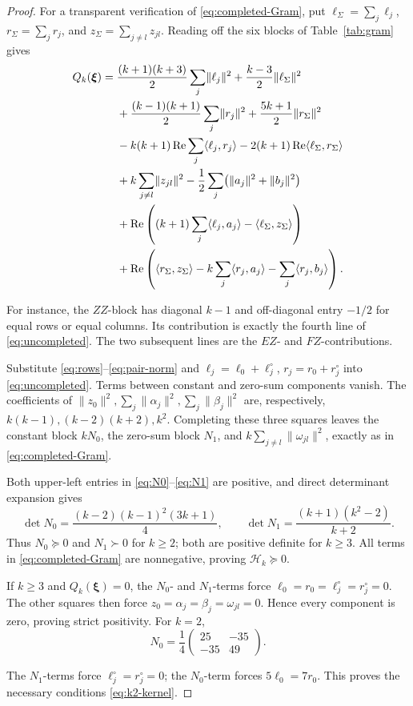 \documentclass[11pt]{article}
\newcommand{\Rea}{\operatorname{Re}}
\newcommand{\gH}{\mathscr H}
\newcommand{\ip}[2]{\langle #1,#2\rangle}
\newcommand{\nrm}[1]{\lVert #1\rVert}
\begin{document}
\begin{proof}
For a transparent verification of \eqref{eq:completed-Gram}, put
\(\ell_\Sigma=\sum_j\ell_j\), \(r_\Sigma=\sum_jr_j\), and
\(z_\Sigma=\sum_{j\ne l}z_{jl}\).
Reading off the six blocks of Table~\ref{tab:gram} gives
\begin{align}
 Q_k(\boldsymbol{\xi})={}&
 \frac{(k+1)(k+3)}2\sum_j\nrm{\ell_j}^2
   +\frac{k-3}2\nrm{\ell_\Sigma}^2
 \notag\\
 &+\frac{(k-1)(k+1)}2\sum_j\nrm{r_j}^2
   +\frac{5k+1}2\nrm{r_\Sigma}^2
 \notag\\
 &-k(k+1)\Rea\sum_j\ip{\ell_j}{r_j}
   -2(k+1)\Rea\ip{\ell_\Sigma}{r_\Sigma}
 \notag\\
 &+k\sum_{j\ne l}\nrm{z_{jl}}^2
   -\frac12\sum_j\bigl(\nrm{a_j}^2+\nrm{b_j}^2\bigr)
 \notag\\
 &+\Rea\left((k+1)\sum_j\ip{\ell_j}{a_j}
                    -\ip{\ell_\Sigma}{z_\Sigma}\right)
 \notag\\
 &+\Rea\left(\ip{r_\Sigma}{z_\Sigma}
              -k\sum_j\ip{r_j}{a_j}-\sum_j\ip{r_j}{b_j}\right).
 \label{eq:uncompleted}
\end{align}

For instance, the \(ZZ\)-block has diagonal \(k-1\) and off-diagonal
entry \(-1/2\) for equal rows or equal columns. Its contribution is
exactly the fourth line of \eqref{eq:uncompleted}.
The two subsequent lines are the \(EZ\)- and \(FZ\)-contributions.

Substitute \eqref{eq:rows}--\eqref{eq:pair-norm} and
\(\ell_j=\ell_0+\ell_j^\circ\), \(r_j=r_0+r_j^\circ\)
into \eqref{eq:uncompleted}. Terms between constant and zero-sum
components vanish. The coefficients of
\(\nrm{z_0}^2,\sum_j\nrm{\alpha_j}^2,
\sum_j\nrm{\beta_j}^2\) are, respectively,
\(k(k-1),(k-2)(k+2),k^2\).
Completing these three squares leaves the constant block \(kN_0\),
the zero-sum block \(N_1\), and
\(k\sum_{j\ne l}\nrm{\omega_{jl}}^2\), exactly as in
\eqref{eq:completed-Gram}.

Both upper-left entries in \eqref{eq:N0}--\eqref{eq:N1} are positive,
and direct determinant expansion gives
\begin{equation}\label{eq:two-determinants}
 \det N_0=\frac{(k-2)(k-1)^2(3k+1)}4,\qquad
 \det N_1=\frac{(k+1)(k^2-2)}{k+2}.
\end{equation}
Thus \(N_0\succeq0\) and \(N_1\succ0\) for \(k\ge2\);
both are positive definite for \(k\ge3\). All terms in
\eqref{eq:completed-Gram} are nonnegative, proving
\(\gH_k\succeq0\).

If \(k\ge3\) and \(Q_k(\boldsymbol{\xi})=0\), the \(N_0\)- and
\(N_1\)-terms force
\(\ell_0=r_0=\ell_j^\circ=r_j^\circ=0\).
The other squares then force \(z_0=\alpha_j=\beta_j=\omega_{jl}=0\).
Hence every component is zero, proving strict positivity.
For \(k=2\),
\[
 N_0=\frac14\begin{pmatrix}25&-35\\-35&49\end{pmatrix}.
\]

The \(N_1\)-terms force \(\ell_j^\circ=r_j^\circ=0\);
the \(N_0\)-term forces \(5\ell_0=7r_0\).
This proves the necessary conditions \eqref{eq:k2-kernel}.
\end{proof}
\end{document}
